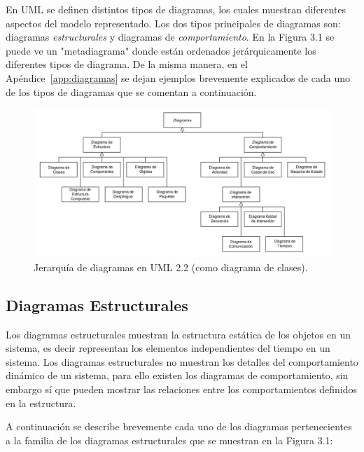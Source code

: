 \documentclass[a4paper, 12pt]{book}
\begin{document}
En UML se definen distintos tipos de diagramas, los cuales muestran diferentes aspectos del modelo representado. 
Los dos tipos principales de diagramas son: diagramas \emph{estructurales} y diagramas de \emph{comportamiento}. En la Figura 3.1 se puede ve un "metadiagrama" donde están ordenados jerárquicamente los diferentes tipos de diagrama. De la misma manera, en el Apéndice~\ref{app:diagramas} se dejan ejemplos brevemente explicados de cada uno de los tipos de diagramas que se comentan a continuación.

\begin{figure}
	\centering
	\includegraphics[width=16cm, keepaspectratio]{img/Uml_diagram.png}
	\caption{Jerarquía de diagramas en UML 2.2 (como diagrama de clases).}\label{fig:Uml_diagram}
\end{figure}

\subsection{Diagramas Estructurales}
Los diagramas estructurales muestran la estructura estática de los objetos en un sistema, es decir representan los elementos independientes del tiempo en un sistema. Los diagramas estructurales no muestran los detalles del comportamiento dinámico de un sistema, para ello existen los diagramas de comportamiento, sin embargo sí que pueden mostrar las relaciones entre los comportamientos definidos en la estructura.  

A continuación se describe brevemente cada uno de los diagramas pertenecientes a la familia de los diagramas estructurales que se muestran en la Figura 3.1: 
\end{document}

